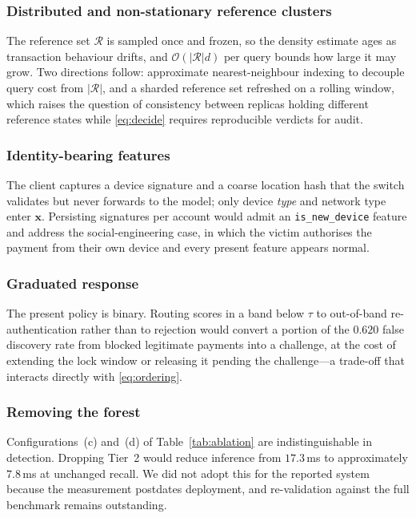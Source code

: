 \documentclass[conference]{IEEEtran}
\begin{document}
\subsubsection{Distributed and non-stationary reference clusters}
The reference set $\mathcal{R}$ is sampled once and frozen, so the
density estimate ages as transaction behaviour drifts, and
$\mathcal{O}(|\mathcal{R}|d)$ per query bounds how large it may grow.
Two directions follow: approximate nearest-neighbour indexing to
decouple query cost from $|\mathcal{R}|$, and a sharded reference set
refreshed on a rolling window, which raises the question of
consistency between replicas holding different reference states while
\eqref{eq:decide} requires reproducible verdicts for audit.

\subsubsection{Identity-bearing features}
The client captures a device signature and a coarse location hash that
the switch validates but never forwards to the model; only device
\emph{type} and network type enter $\mathbf{x}$. Persisting signatures
per account would admit an \texttt{is\_new\_device} feature and address
the social-engineering case, in which the victim authorises the
payment from their own device and every present feature appears
normal.

\subsubsection{Graduated response}
The present policy is binary. Routing scores in a band below $\tau$ to
out-of-band re-authentication rather than to rejection would convert a
portion of the $0.620$ false discovery rate from blocked legitimate
payments into a challenge, at the cost of extending the lock window or
releasing it pending the challenge---a trade-off that interacts
directly with \eqref{eq:ordering}.

\subsubsection{Removing the forest}
Configurations~(c) and~(d) of Table~\ref{tab:ablation} are
indistinguishable in detection. Dropping Tier~2 would reduce inference
from $17.3$\,ms to approximately $7.8$\,ms at unchanged recall. We did
not adopt this for the reported system because the measurement
postdates deployment, and re-validation against the full benchmark
remains outstanding.



\end{document}
